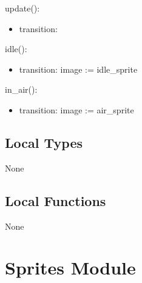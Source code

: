\documentclass[12pt]{article}
\begin{document}
update():
\begin{itemize}
    \item transition:
\end{itemize}

idle():
\begin{itemize}
    \item transition: image := idle\_sprite
\end{itemize}

in\_air():
\begin{itemize}
    \item transition: image := air\_sprite
\end{itemize}

\subsection* {Local Types}

None

\subsection* {Local Functions}

None

\newpage

\section* {Sprites Module}
\end{document}
